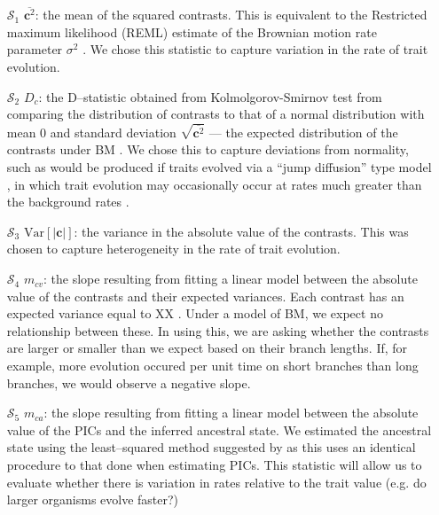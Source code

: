 \documentclass[12pt]{article}
\begin{document}
\begin{enumerate}
\item[$\mathcal{S}_1$] $\overline{\mathbf{c}^2}$: the mean of the squared contrasts. This is equivalent to the Restricted maximum likelihood (REML) estimate of the Brownian motion rate parameter $\sigma^2$ \citep{Garland1992, Rohlf2001}. We chose this statistic to capture variation in the rate of trait evolution.

\item[$\mathcal{S}_2$] $D_c$: the D--statistic obtained from Kolmolgorov-Smirnov test \citep{ks} from comparing the distribution of contrasts to that of a normal distribution with mean 0 and standard deviation $\sqrt{\overline{\mathbf{c}^2}}$ --- the expected distribution of the contrasts under BM \citep{Felsenstein1985, Rohlf2001}. We chose this to capture deviations from normality, such as would be produced if traits evolved via a ``jump diffusion'' type model \citep{Landis2013, Eastmanjump}, in which trait evolution may occasionally occur at rates much greater than the background rates \citep[see][]{PennellPE}.

\item[$\mathcal{S}_3$] $\mathrm{Var}[| \mathbf{c} |]$: the variance in the absolute value of the contrasts. This was chosen to capture heterogeneity in the rate of trait evolution.

\item[$\mathcal{S}_4$] $m_{cv}$: the slope resulting from fitting a linear model between the absolute value of the contrasts and their expected variances. Each contrast has an expected variance equal to XX \citep{Felsenstein1985}. Under a model of BM, we expect no relationship between these. In using this, we are asking whether the contrasts are larger or smaller than we expect based on their branch lengths. If, for example, more evolution occured per unit time on short branches than long branches, we would observe a negative slope.

\item[$\mathcal{S}_5$] $m_{ca}$: the slope resulting from fitting a linear model between the absolute value of the PICs and the inferred ancestral state. We estimated the ancestral state using the least--squared method suggested by \citep{Felsenstein1985} as this uses an identical procedure to that done when estimating PICs. This statistic will allow us to evaluate whether there is variation in rates relative to the trait value (e.g. do larger organisms evolve faster?)


\end{enumerate}
\end{document}

